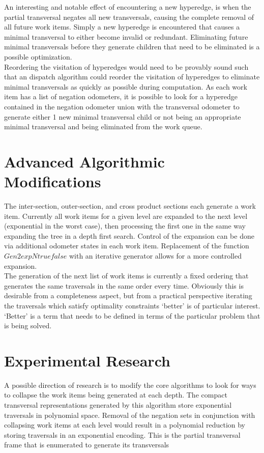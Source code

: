 An interesting and notable effect of encountering a new hyperedge, is when the partial transversal negates all new transversals, causing the complete removal of all future work items. Simply a new hyperedge is encountered that causes a minimal transversal to either become invalid or redundant. Eliminating future minimal transversals before they generate children that need to be eliminated is a possible optimization. \\

Reordering the visitation of hyperedges would need to be provably sound such that an dispatch algorithm could reorder the visitation of hyperedges to eliminate minimal transversals as quickly as possible during computation. As each work item has a list of negation odometers, it is possible to look for a hyperedge contained in the negation odometer union with the transversal odometer to generate either 1 new minimal transversal child or not being an appropriate minimal transversal and being eliminated from the work queue. \\






\section{Advanced Algorithmic Modifications}
The inter-section, outer-section, and cross product sections each generate a work item. Currently all work items for a given level are expanded to the next level (exponential in the worst case), then processing the first one in the same way expanding the tree in a depth first search. Control of the expansion can be done via additional odometer states in each work item. Replacement of the function $Gen2expNtruefalse$ with an iterative generator allows for a more controlled expansion. \\

The generation of the next list of work items is currently a fixed ordering that generates the same traversals in the same order every time. Obviously this is desirable from a completeness aspect, but from a practical perspective iterating the traversals which satisfy optimality constraints `better' is of particular interest. `Better' is a term that needs to be defined in terms of the particular problem that is being solved. \cite{khachiyan2006efficient}\\




\section{Experimental Research}
A possible direction of research is to modify the core algorithms to look for ways to collapse the work items being generated at each depth. The compact transversal representations generated by this algorithm store exponential traversals in polynomial space. Removal of the negation sets in conjunction with collapsing work items at each level would result in a polynomial reduction by storing traversals in an exponential encoding. This is the partial transversal frame that is enumerated to generate its transversals \\

